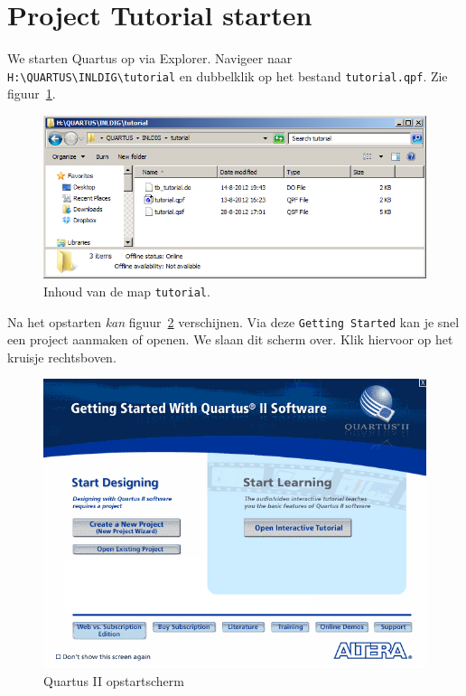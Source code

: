 \documentclass[a4paper,12pt,fleqn,twoside]{book}
\def\tutpicscale{0.455}
\begin{document}
\section{Project Tutorial starten}
\label{sec:projecttutorialstarten}
We starten Quartus op via Explorer. Navigeer naar
\lstinline|H:\QUARTUS\INLDIG\tutorial| en dubbelklik op het bestand
\lstinline|tutorial.qpf|. Zie figuur~\ref{fig:010tutorialmap}.

\begin{figure}[H]
\centering
\includegraphics[scale=\tutpicscale]{010tutorialmap}
\caption{Inhoud van de map \lstinline|tutorial|.}
\label{fig:010tutorialmap}
\end{figure}

Na het opstarten \textsl{kan} figuur~\ref{fig:011infoscreen} verschijnen. Via
deze \texttt{Getting Started} kan je snel een project aanmaken of openen. We
slaan dit scherm over. Klik hiervoor op het kruisje rechtsboven.

\begin{figure}[H]
\centering
\includegraphics[scale=\tutpicscale]{011infoscreen.png}
\caption{Quartus II opstartscherm}
\label{fig:011infoscreen}
\end{figure}
\end{document}
